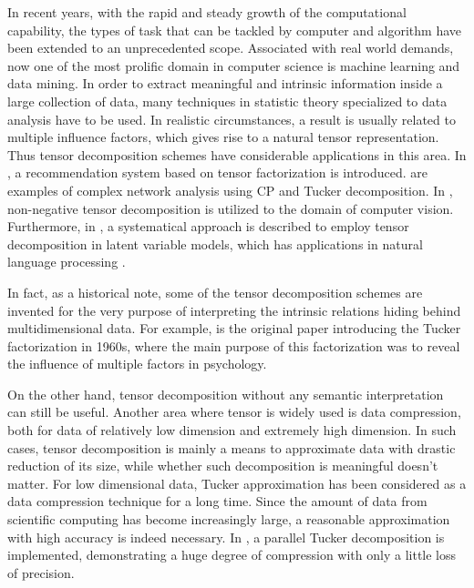 \documentclass[12pt]{article}
\begin{document}
In recent years, with the rapid and steady growth of the computational capability, the types of task that can be tackled by computer and algorithm have been extended to an unprecedented scope. Associated with real world demands, now one of the most prolific domain in computer science is machine learning and data mining. In order to extract meaningful and intrinsic information inside a large collection of data, many techniques in statistic theory specialized to data analysis have to be used. In realistic circumstances, a result is usually related to multiple influence factors, which gives rise to a natural tensor representation. Thus tensor decomposition schemes have considerable applications in this area. In \cite{tensorapprecom}, a recommendation system based on tensor factorization is introduced. \cite{tensorappmining1} \cite{cpnetmining} are examples of complex network analysis using CP and Tucker decomposition. In \cite{tensorappvision}, non-negative tensor decomposition is utilized to the domain of computer vision. Furthermore, in \cite{tensorapplearn1}, a systematical approach is described to employ tensor decomposition in latent variable models, which has applications in natural language processing \cite{tensorapplang}. 

In fact, as a historical note, some of the tensor decomposition schemes are invented for the very purpose of interpreting the intrinsic relations hiding behind multidimensional data. For example, \cite{Tucker1966} is the original paper introducing the Tucker factorization in 1960s, where the main purpose of this factorization was to reveal the influence of multiple factors in psychology.

On the other hand, tensor decomposition without any semantic interpretation can still be useful. Another area where tensor is widely used is data compression, both for data of relatively low dimension and extremely high dimension. In such cases, tensor decomposition is mainly a means to approximate data with drastic reduction of its size, while whether such decomposition is meaningful doesn't matter. For low dimensional data, Tucker approximation has been considered as a data compression technique for a long time. Since the amount of data from scientific computing has become increasingly large, a reasonable approximation with high accuracy is indeed necessary. In \cite{koldapara}, a parallel Tucker decomposition is implemented, demonstrating a huge degree of compression with only a little loss of precision. 
\end{document}

